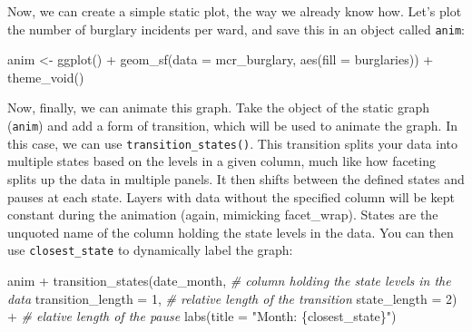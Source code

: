 \documentclass[
]{book}
\newenvironment{Shaded}{\begin{snugshade}}{\end{snugshade}}
\newcommand{\AttributeTok}[1]{\textcolor[rgb]{0.77,0.63,0.00}{#1}}
\newcommand{\CommentTok}[1]{\textcolor[rgb]{0.56,0.35,0.01}{\textit{#1}}}
\newcommand{\DecValTok}[1]{\textcolor[rgb]{0.00,0.00,0.81}{#1}}
\newcommand{\FunctionTok}[1]{\textcolor[rgb]{0.00,0.00,0.00}{#1}}
\newcommand{\NormalTok}[1]{#1}
\newcommand{\OtherTok}[1]{\textcolor[rgb]{0.56,0.35,0.01}{#1}}
\newcommand{\SpecialCharTok}[1]{\textcolor[rgb]{0.00,0.00,0.00}{#1}}
\newcommand{\StringTok}[1]{\textcolor[rgb]{0.31,0.60,0.02}{#1}}
\begin{document}
Now, we can create a simple static plot, the way we already know how. Let's plot the number of burglary incidents per ward, and save this in an object called \texttt{anim}:

\begin{Shaded}
\begin{Highlighting}[]
\NormalTok{anim }\OtherTok{\textless{}{-}} \FunctionTok{ggplot}\NormalTok{() }\SpecialCharTok{+}
  \FunctionTok{geom\_sf}\NormalTok{(}\AttributeTok{data =}\NormalTok{ mcr\_burglary, }
          \FunctionTok{aes}\NormalTok{(}\AttributeTok{fill =}\NormalTok{ burglaries)) }\SpecialCharTok{+} 
  \FunctionTok{theme\_void}\NormalTok{()}
\end{Highlighting}
\end{Shaded}

Now, finally, we can animate this graph. Take the object of the static graph (\texttt{anim}) and add a form of transition, which will be used to animate the graph. In this case, we can use \texttt{transition\_states()}. This transition splits your data into multiple states based on the levels in a given column, much like how faceting splits up the data in multiple panels. It then shifts between the defined states and pauses at each state. Layers with data without the specified column will be kept constant during the animation (again, mimicking facet\_wrap). States are the unquoted name of the column holding the state levels in the data. You can then use \texttt{closest\_state} to dynamically label the graph:

\begin{Shaded}
\begin{Highlighting}[]
\NormalTok{anim }\SpecialCharTok{+} 
  \FunctionTok{transition\_states}\NormalTok{(date\_month,  }\CommentTok{\# column holding the state levels in the data}
                    \AttributeTok{transition\_length =} \DecValTok{1}\NormalTok{, }\CommentTok{\# relative length of the transition}
                    \AttributeTok{state\_length =} \DecValTok{2}\NormalTok{) }\SpecialCharTok{+} \CommentTok{\# elative length of the pause }
  \FunctionTok{labs}\NormalTok{(}\AttributeTok{title =} \StringTok{"Month: \{closest\_state\}"}\NormalTok{)}
\end{Highlighting}
\end{Shaded}
\end{document}
